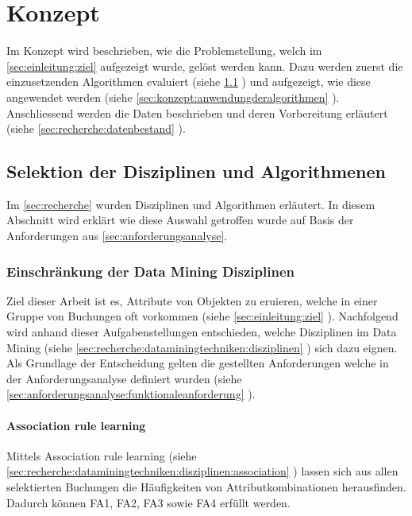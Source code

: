\chapter{Konzept}
\label{sec:konzept}
Im Konzept wird beschrieben, wie die Problemstellung, welch im \cref{sec:einleitung:ziel} aufgezeigt wurde, gelöst werden kann. Dazu werden zuerst die einzusetzenden Algorithmen evaluiert (siehe \cref{sec:konzept:disziplin-und-algorithmen} ) und aufgezeigt, wie diese angewendet werden (siehe \cref{sec:konzept:anwendungderalgorithmen} ). Anschliessend werden die Daten beschrieben und deren Vorbereitung erläutert (siehe \cref{sec:recherche:datenbestand} ). 

\section{Selektion der Disziplinen und Algorithmenen}
\label{sec:konzept:disziplin-und-algorithmen}
Im \cref{sec:recherche} wurden Disziplinen und Algorithmen erläutert. In diesem Abschnitt wird erklärt wie diese Auswahl getroffen wurde auf Basis der Anforderungen aus \cref{sec:anforderungsanalyse}.

\subsection{Einschränkung der Data Mining Disziplinen}
\label{sec:konzept:disziplinauswahl}
Ziel dieser Arbeit ist es, Attribute von Objekten zu eruieren, welche in einer Gruppe von Buchungen oft vorkommen (siehe \cref{sec:einleitung:ziel} ). Nachfolgend wird anhand dieser Aufgabenstellungen entschieden, welche Disziplinen im Data Mining (siehe \cref{sec:recherche:dataminingtechniken:disziplinen} ) sich dazu eignen. Als Grundlage der Entscheidung gelten die gestellten Anforderungen welche in der Anforderungsanalyse definiert wurden (siehe \cref{sec:anforderungsanalyse:funktionaleanforderung} ).


\subsubsection{Association rule learning}
\label{sec:konzept:disziplinauswahl:association}
Mittels Association rule learning (siehe \cref{sec:recherche:dataminingtechniken:disziplinen:association} ) lassen sich aus allen selektierten Buchungen die Häufigkeiten von Attributkombinationen herausfinden. Dadurch können FA1, FA2, FA3 sowie FA4 erfüllt werden.


